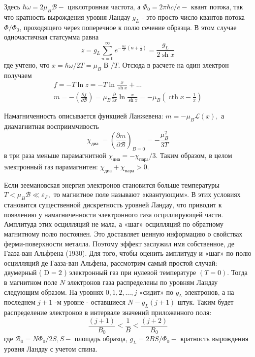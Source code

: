 \documentclass[a4paper,12pt]{article} %
\begin{document}
\begin{ttask}
Здесь $\hbar \omega=2 \mu_{B} \mathcal{B}-$ циклотронная частота, 
а $\Phi_{0}=2 \pi \hbar c / e-$ квант потока, так
что кратность вырождения уровня Ландау $g_{L}$ - это просто число квантов
потока $\Phi / \Phi_{0}$, проходящего через поперечное к полю сечение образца. В
этом случае одночастичная статсумма равна
$$
z
=
g_{L} \sum_{n=0}^{\infty} 
e^{-\frac{h \omega}{T}\left(n+\frac{1}{2}\right)}
=
\frac{g_{L}}{2 \operatorname{sh} x}
$$
где учтено, что $x=\hbar \omega / 2 T=\mu_{B}$ В $/ T$. Отсюда в расчете на один электрон
получаем
$$
\begin{array}{c}
	f=-T \ln z=-T \ln \frac{x}{\operatorname{sh} x}+\ldots 
	\\
	m=-\left(\frac{\partial f}{\partial \mathcal{B}}\right)
	=
	\mu_{B} \frac{\partial}{\partial x} \ln \frac{x}{\operatorname{sh} x}
	=
	-\mu_{B}\left(\operatorname{cth} x-\frac{1}{x}\right)
\end{array}
$$


Намагниченность описывается функцией Ланжевена: $m=-\mu_{B} \mathcal{L}(x),$ 
а диамагнитная восприимчивость
$$
\chi_{\text {диа }}=\left(\frac{\partial m}{\partial \mathcal{B}}\right)_{B=0}=-\frac{\mu_{B}^{2}}{3 T}
$$
в три раза меньше парамагнитной $\chi_{\text {диа}}=-\chi_{\text {пара}} / 3 .$ Таким образом, в целом
электронный газ парамагнитен: $\chi_{\text {диа}}+\chi_{\text {пара}}>0 .$



Если зеемановская энергия электронов становится больше температуры $T<\mu_{B} \mathcal{B} \ll \varepsilon_{F},$ то магнитное поле называют «квантующим». 
В этих условиях становится существенной дискретность уровней Ландау, что приводит к 
появлению у намагниченности электронного газа осциллирующей части. 
Амплитуда этих осцилляций не мала, а «шаг» осцилляций по обратному магнитному полю постоянен. 
Это доставляет ценную информацию о свойствах ферми-поверхности металла. Поэтому эффект заслужил имя собственное, де Гааза-ван Альфрена (1930). 
Для того, чтобы оценить амплитуду и «шаг» по полю осцилляций де Гааза-ван Альфена, 
рассмотрим самый простой случай: двумерный ( $\mathrm{D}=2$ ) электронный газ при нулевой температуре $(T=0) .$ Тогда в 
магнитном поле $N$ электронов газа распределены по уровням Ландау следующим образом. 
На уровнях $0,1,2, \ldots, j$ «сидит» по $g_{L}$ электронов, а на последнем $j+1$ -м уровне - оставшиеся $N-g_{L}(j+1)$ штук. 
Таким будет распределение электронов в интервале значений приложенного поля:
$$
\frac{(j+1)}{B_{0}}<\frac{1}{B}<\frac{(j+2)}{B_{0}}
$$
где $\mathcal{B}_{0}=N \Phi_{0} / 2 S, S-$ площадь образца, $g_{L}=2 B S / \Phi_{0}-$ кратность вырождения уровня Ландау с учетом спина. 



\end{ttask}
\end{document}
